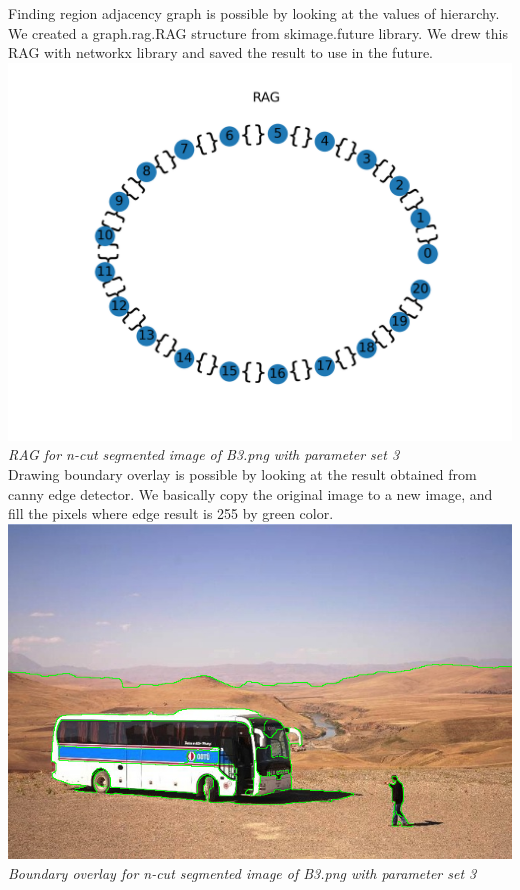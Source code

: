 \documentclass[conference]{IEEEtran}
\begin{document}
Finding region adjacency graph is possible by looking at the values of hierarchy. We created a graph.rag.RAG structure from skimage.future library. We drew this RAG with networkx library and saved the result to use in the future.\\

\includegraphics[width=0.9\linewidth]{rag.png}
\\
\textit{RAG for n-cut segmented image of B3.png with parameter set 3}\\


Drawing boundary overlay is possible by looking at the result obtained from canny edge detector. We basically copy the original image to a new image, and fill the pixels where edge result is 255 by green color.\\

\includegraphics[width=0.9\linewidth]{boundary.png}
\\
\textit{Boundary overlay for n-cut segmented image of B3.png with parameter set 3}\\
\end{document}
